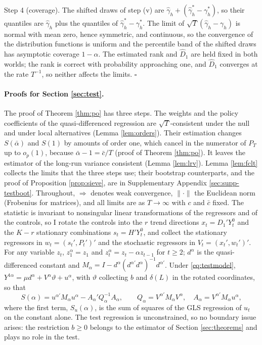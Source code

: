 \documentclass[12pt,a4paper]{article}
\theoremstyle{definition}
\theoremstyle{definition}\newtheorem{example}{Example}
\theoremstyle{definition}\newtheorem{definition}{Definition}
\begin{document}
Step 4 (coverage). The shifted draws of step (v) are $\hat\gamma_h+(\hat\gamma^\ast_h-\gamma^\ast_h)$, so their quantiles are $\hat\gamma_h$ plus the quantiles of $\hat\gamma^\ast_h-\gamma^\ast_h$. The limit of $\sqrt{T}(\hat\gamma_h-\gamma_h)$ is normal with mean zero, hence symmetric, and continuous, so the convergence of the distribution functions is uniform and the percentile band of the shifted draws has asymptotic coverage $1-\alpha$. The estimated rank and $\hat D_1$ are held fixed in both worlds; the rank is correct with probability approaching one, and $\hat D_1$ converges at the rate $T^{-1}$, so neither affects the limits. $\square$

\paragraph{Proofs for Section \ref{sec:test}.} The proof of Theorem \ref{thm:po} has three steps. The weights and the policy coefficients of the quasi-differenced regression are $\sqrt{T}$-consistent under the null and under local alternatives (Lemma \ref{lem:orders}). Their estimation changes $S(\bar\alpha)$ and $S(1)$ by amounts of order one, which cancel in the numerator of $P_T$ up to $o_p(1)$, because $\bar\alpha-1=\bar c/T$ (proof of Theorem \ref{thm:po}). It leaves the estimator of the long-run variance consistent (Lemma \ref{lem:lrv}). Lemma \ref{lem:fclt} collects the limits that the three steps use; their bootstrap counterparts, and the proof of Proposition \ref{prop:sieve}, are in Supplementary Appendix \ref{sec:supp-testboot}. Throughout, $\Rightarrow$ denotes weak convergence, $\|\cdot\|$ the Euclidean norm (Frobenius for matrices), and all limits are as $T\to\infty$ with $c$ and $\bar c$ fixed. The statistic is invariant to nonsingular linear transformations of the regressors and of the controls, so I rotate the controls into the $r$ trend directions $x_t=D_1'Y^0_t$ and the $K-r$ stationary combinations $s_t=H'Y^0_t$, and collect the stationary regressors in $w_t=(s_t',P_t')'$ and the stochastic regressors in $V_t=(x_t',w_t')'$. For any variable $z_t$, $z^\alpha_1=z_1$ and $z^\alpha_t=z_t-\alpha z_{t-1}$ for $t\geq2$; $d^\alpha$ is the quasi-differenced constant and $M_\alpha=I-d^\alpha(d^{\alpha\prime}d^\alpha)^{-1}d^{\alpha\prime}$. Under \eqref{eq:testmodel}, $Y^{1\alpha}=\mu d^\alpha+V^\alpha\vartheta+u^\alpha$, with $\vartheta$ collecting $b$ and $\delta(L)$ in the rotated coordinates, so that
\begin{equation}
S(\alpha)=u^{\alpha\prime}M_\alpha u^\alpha-A_\alpha'Q_\alpha^{-1}A_\alpha,\qquad Q_\alpha=V^{\alpha\prime}M_\alpha V^\alpha,\quad A_\alpha=V^{\alpha\prime}M_\alpha u^\alpha,
\label{eq:Sdecomp}
\end{equation}
where the first term, $S_u(\alpha)$, is the sum of squares of the GLS regression of $u_t$ on the constant alone. The test regression is unconstrained, so no boundary issue arises: the restriction $b\geq0$ belongs to the estimator of Section \ref{sec:theorems} and plays no role in the test.
\end{document}
